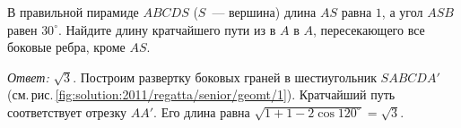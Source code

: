 В правильной пирамиде $ABCDS$ ($S$~--- вершина) длина $AS$ равна $1$, а угол
$ASB$ равен $30^\circ$.
Найдите длину кратчайшего пути из в $A$ в $A$, пересекающего все боковые ребра,
кроме $AS$.

%
\label{solution:2011/regatta/senior/geomt/1}%
\emph{Ответ:} $\sqrt{3}$.
Построим развертку боковых граней в шестиугольник $SABCDA'$
(см.\,рис.\,\ref{fig:solution:2011/regatta/senior/geomt/1}).
Кратчайший путь соответствует отрезку $AA'$.
Его длина равна $\sqrt{1 + 1 - 2 \cos 120^\circ} = \sqrt{3}$.

